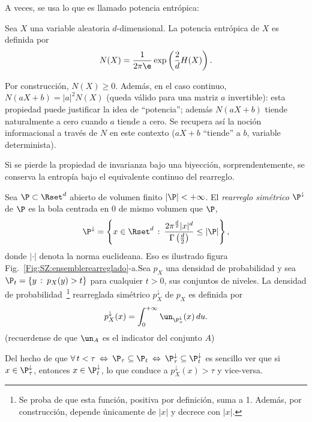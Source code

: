 A veces, se usa lo que es llamado potencia entr\'opica:
%
\begin{definicion}
  Sea $X$ una variable aleatoria $d$-dimensional. La potencia entr\'opica de $X$
  es definida por
  \[
  N(X) = \frac{1}{2 \pi \e} \exp\left( \frac2d H(X) \right).
  \]
\end{definicion}
%
\noindent Por construcci\'on, $N(X) \ge 0$.  Adem\'as, en el caso continuo, $N(a
X+b)  =  |a|^2 N(X)$  (queda  v\'alido para  una  matriz  $a$ invertible):  esta
propiedad puede justificar  la idea de ``potencia''; adem\'as  $N(a X+b)$ tiende
naturalmente a  cero cuando $a$  tiende a cero.   Se recupera as\'i  la noci\'on
informacional a trav\'es  de $N$ en este  contexto ($a X + b$  ``tiende'' a $b$,
variable determinista).

Si se pierde la propiedad de invarianza bajo una biyecci\'on, sorprendentemente,
se conserva la entrop\'ia bajo el equivalente continuo del rearreglo.
%
\begin{definicion}\label{Def:SZ:rearreglo}
  Sea $\P \subset \Rset^d$ abierto de  volumen finito $|\P| < +\infty$.  El {\it
    rearreglo sim\'etrico} $\P^\downarrow$  de $\P$ es la bola  centrada en 0 de
  mismo volumen que $\P$, \ie
  \[
  \P^\downarrow  = \left\{  x  \in  \Rset^d \,  :  \: \frac{2  \pi^{\frac{d}{2}}
      |x|^d}{\Gamma\left(\frac{d}{2}\right)} \le |\P| \right\},
  \]
  donde  $|\cdot|$  denota  la   norma  euclideana.   Eso  es  ilustrado  figura
  Fig.~\ref{Fig:SZ:ensemblerearreglado}-a.\newline  Sea  $p_X$  una densidad  de
  probabilidad y sea $\P_t = \{ y \, : \: p_X(y) > t \}$ para cualquier $t > 0$,
  sus conjuntos  de niveles.  La densidad de  probabilidad~\footnote{Se proba de
    que  esta funci\'on,  positiva por  definici\'on, suma  a 1.   Adem\'as, por
    construcci\'on,  depende  \'unicamente  de   $|x|$  y  decrece  con  $|x|$.}
  rearreglada sim\'etrico $p^\downarrow_X$ de $p_X$ es definida por
  \[
  p^\downarrow_X(x)  =  \int_0^{+\infty}  \un_{\P_u^\downarrow}(x) \,  du.
  \]
  (recuerdense de que $\un_A$ es el indicator  del conjunto $A$)
\end{definicion}
%
Del hecho  de que $\forall \, t  < \tau \: \Leftrightarrow  \: \P_\tau \subseteq
\P_t  \:  \Leftrightarrow \:  \P_\tau^\downarrow  \subseteq \P_t^\downarrow$  es
sencillo   ver   que   si   $x   \in  \P_\tau^\downarrow$,   entonces   $x   \in
\P_t^\downarrow$,  lo que  conduce a  $p_X^\downarrow(x) >  \tau$  y vice-versa.
